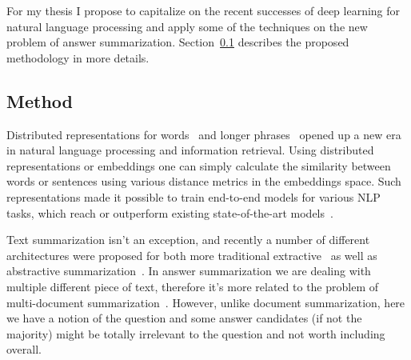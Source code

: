 For my thesis I propose to capitalize on the recent successes of deep learning for natural language processing and apply some of the techniques on the new problem of answer summarization.
Section~\ref{section:non-factoid:proposal:method} describes the proposed methodology in more details.

\subsection{Method}
\label{section:non-factoid:proposal:method}

Distributed representations for words~\cite{mikolov2013distributed,pennington2014glove} and longer phrases~\cite{le2014distributed,kiros2015skip} opened up a new era in natural language processing and information retrieval.
Using distributed representations or embeddings one can simply calculate the similarity between words or sentences using various distance metrics in the embeddings space.
Such representations made it possible to train end-to-end models for various NLP tasks, which reach or outperform existing state-of-the-art models~\cite{collobert2011natural}.

Text summarization isn't an exception, and recently a number of different architectures were proposed for both more traditional extractive~\cite{kaageback2014extractive} as well as abstractive summarization~\cite{rush-chopra-weston:2015:EMNLP,chopraabstractive16}.
In answer summarization we are dealing with multiple different piece of text, therefore it's more related to the problem of multi-document summarization~\cite{cao2015ranking}.
However, unlike document summarization, here we have a notion of the question and some answer candidates (if not the majority) might be totally irrelevant to the question and not worth including overall.

